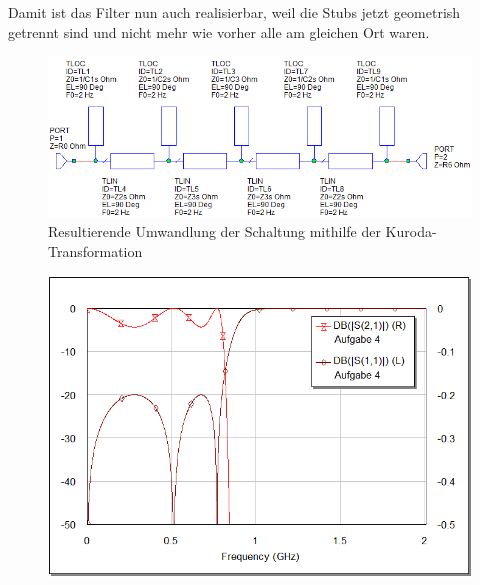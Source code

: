 Damit ist das Filter nun auch realisierbar, weil die  Stubs  jetzt  geometrish
getrennt  sind  und  nicht  mehr  wie  vorher  alle  am  gleichen  Ort  waren.

\begin{figure}[h!]
    \centering
    \includegraphics[width=\imagewidth]{images/stripline-kuroda}
    \caption{Resultierende Umwandlung der Schaltung mithilfe der Kuroda-Transformation}
    \label{fig:stripline-kuroda}
\end{figure}

\begin{figure}[h!]
    \centering
    \includegraphics[width=\imagewidth]{images/graph-kuroda}
    \caption{}
    \label{fig:graph-kuroda}
\end{figure}

